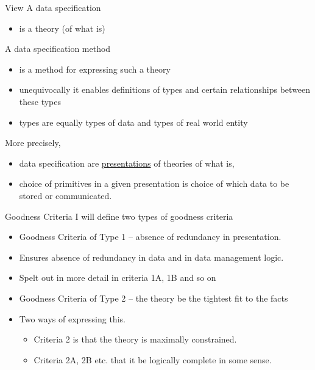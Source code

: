 \begin{frame}{View}
A data specification  
\begin{itemize}
\item is a  theory (of what is)
\end{itemize}
\medskip
A data specification method 
\begin{itemize}
\item is a method for expressing such a  theory
\item unequivocally it enables definitions of types and certain relationships between these types
\item types are equally types of data and types of real world entity
\end{itemize}
More precisely, 
\begin{itemize}
\item data specification are \underline{presentations} of theories of what is,
\item choice of primitives in a given presentation is choice of which data to be stored or communicated.
\end{itemize}
\end{frame}

\begin{frame}{Goodness Criteria}
I will define two types of goodness criteria
\begin{itemize}
    \item Goodness Criteria of Type 1 -- absence of redundancy in presentation.
    \item Ensures absence of redundancy in data and in data management logic.
    \item Spelt out in more detail in criteria 1A, 1B and so on
    \item  Goodness Criteria of Type 2 -- the theory be the tightest fit to the facts 
    \item Two ways of expressing this. 
    \begin{itemize}
        \item Criteria 2 is that the theory is maximally constrained.
        \item Criteria 2A, 2B etc.  that it be logically complete in some sense.
    \end{itemize}
\end{itemize}
\end{frame}

